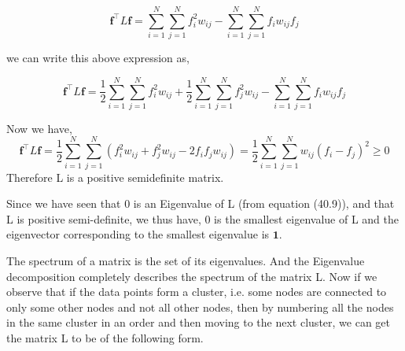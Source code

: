 \documentclass[english]{article}
\renewcommand{\geq}{\geqslant}
\theoremstyle{plain}
\begin{document}
 \begin{equation}
\boldsymbol{f}^{\top}L\boldsymbol{f} = 
\sum_{i=1}^{N} \sum_{j=1}^{N} f^{2}_{i} w_{ij}
- \sum_{i=1}^{N} \sum_{j=1}^{N} f_{i} w_{ij} f_{j}
\end{equation}

we can write this above expression as,

  \begin{equation}
\boldsymbol{f}^{\top}L\boldsymbol{f} = 
\frac{1}{2}\sum_{i=1}^{N} \sum_{j=1}^{N} f^{2}_{i} w_{ij} + \frac{1}{2}\sum_{i=1}^{N} \sum_{j=1}^{N} f^{2}_{j} w_{ij}
- \sum_{i=1}^{N} \sum_{j=1}^{N} f_{i} w_{ij} f_{j}
\end{equation}

Now we have,
\begin{equation}
\boldsymbol{f}^{\top}L\boldsymbol{f} = 
\frac{1}{2}\sum_{i=1}^{N} \sum_{j=1}^{N} \left( f^{2}_{i} w_{ij} + f^{2}_{j} w_{ij} - 2f_{i}f_{j} w_{ij} \right) = \frac{1}{2}\sum_{i=1}^{N} \sum_{j=1}^{N}  w_{ij}\left( f_{i} - f_{j} \right)^{2} \geq 0  
\end{equation}
Therefore L is a positive semidefinite matrix.

Since we have seen that 0 is an Eigenvalue of L (from equation (40.9)), and that L is positive semi-definite, we thus have, 0 is the smallest eigenvalue of L and the eigenvector corresponding to the smallest eigenvalue is $\boldsymbol{1}$.

The spectrum of a matrix is the set of its eigenvalues. And the Eigenvalue decomposition completely describes the spectrum of the matrix L. Now if we observe that if the data points form a cluster, i.e. some nodes are connected to only some other nodes and not all other nodes, then by numbering all the nodes in the same cluster in an order and then moving to the next cluster, we can get the matrix L to be of the following form.

\bigskip
\end{document}
